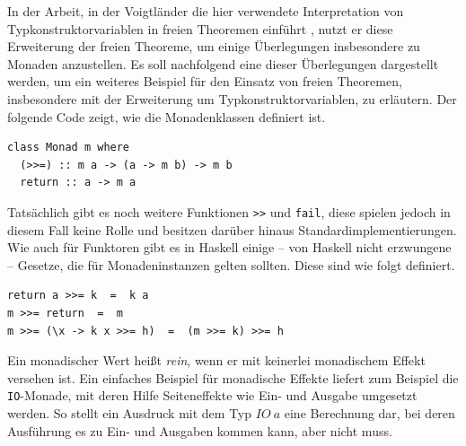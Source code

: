 %


In der Arbeit, in der Voigtländer die hier verwendete Interpretation von Typkonstruktorvariablen in freien Theoremen
einführt \cite{voigtlander}, nutzt er diese Erweiterung der freien Theoreme, um einige Überlegungen insbesondere zu Monaden
anzustellen. Es soll nachfolgend eine dieser Überlegungen dargestellt werden, um ein weiteres Beispiel für den Einsatz von
freien Theoremen, insbesondere mit der Erweiterung um Typkonstruktorvariablen, zu erläutern.
Der folgende Code zeigt, wie die Monadenklassen definiert ist.

\begin{verbatim}
class Monad m where
  (>>=) :: m a -> (a -> m b) -> m b
  return :: a -> m a
\end{verbatim}

Tatsächlich gibt es noch weitere Funktionen \texttt{>>} und \texttt{fail}, diese spielen jedoch in diesem Fall keine Rolle und besitzen
darüber hinaus Standardimplementierungen. Wie auch für Funktoren gibt es in Haskell einige -- von Haskell nicht erzwungene -- Gesetze,
die für Monadeninstanzen gelten sollten. Diese sind wie folgt definiert.

\begin{verbatim}
return a >>= k  =  k a
m >>= return  =  m
m >>= (\x -> k x >>= h)  =  (m >>= k) >>= h
\end{verbatim}


Ein monadischer Wert heißt \textit{rein}, wenn er mit keinerlei monadischem Effekt versehen ist. Ein einfaches Beispiel für monadische
Effekte liefert zum Beispiel die \texttt{IO}-Monade, mit deren Hilfe Seiteneffekte wie Ein- und Ausgabe umgesetzt werden. So
stellt ein Ausdruck mit dem Typ $IO\ a$ eine Berechnung dar, bei deren Ausführung es zu Ein- und Ausgaben kommen kann, aber
nicht muss.


